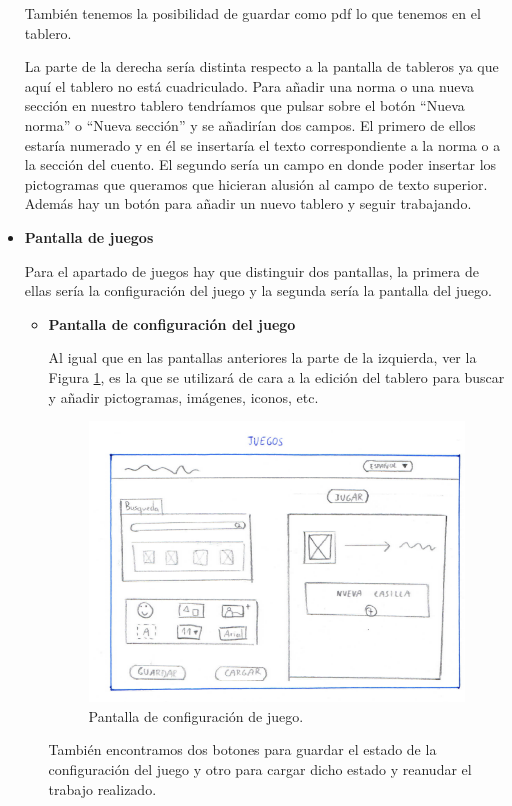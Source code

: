 \begin{itemize}
	También tenemos la posibilidad de guardar como pdf lo que tenemos en el tablero.
	
	
	La parte de la derecha sería distinta respecto a la pantalla de tableros ya que aquí el tablero no está cuadriculado. Para añadir una norma o una nueva sección en nuestro tablero tendríamos que pulsar sobre el botón “Nueva norma” o “Nueva sección” y se añadirían dos campos. El primero de ellos estaría numerado y en él se insertaría el texto correspondiente a la norma o a la sección del cuento. El segundo sería un campo en donde poder insertar los pictogramas que queramos que hicieran alusión al campo de texto superior. Además hay  un botón para añadir un nuevo tablero y seguir trabajando.
	
	
	\item \textbf{Pantalla de juegos}
	
	Para el apartado de juegos hay que distinguir dos pantallas, la primera de ellas sería la configuración del juego y la segunda sería la pantalla del juego.
	
	\begin{itemize}
		\item \textbf{Pantalla de configuración del juego}
		
		Al igual que en las pantallas anteriores la parte de la izquierda, ver la Figura \ref{fig:juegosjorge}, es la que se utilizará de cara a la edición del tablero para buscar  y añadir pictogramas, imágenes, iconos, etc.
		
		\begin{figure}[h!]
			\centering
			\includegraphics[width=0.7\linewidth]{Imagenes/Bitmap/juegosJorge}
			\caption{Pantalla de configuración de juego.}
			\label{fig:juegosjorge}
		\end{figure}
		
		También encontramos dos botones para guardar el estado de la configuración del juego y otro para cargar dicho estado y reanudar el trabajo realizado.
		

\end{itemize}
\end{itemize}
